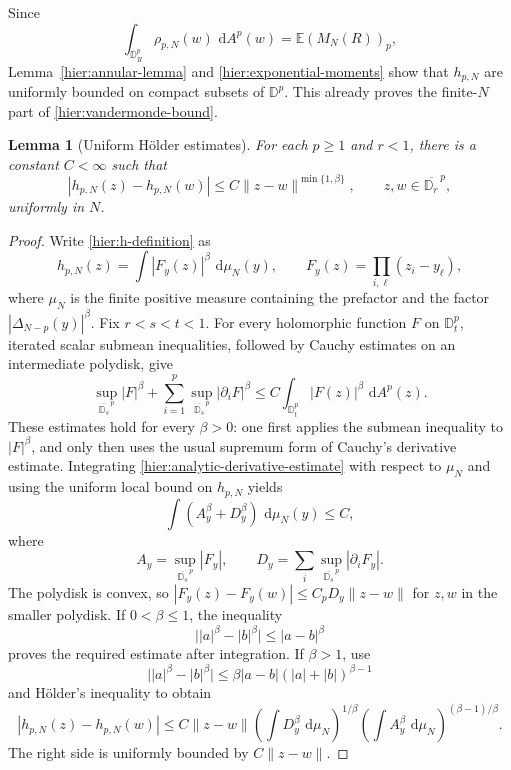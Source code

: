 \documentclass[11pt,a4paper]{article}
\numberwithin{equation}{section}
\newtheorem{lemma}[theorem]{Lemma}
\theoremstyle{definition}
\theoremstyle{remark}
\newcommand{\D}{\mathbb D}
\newcommand{\E}{\mathbb E}
\newcommand{\dd}{\,\mathrm d}
\begin{document}
Since
\[
 \int_{\D_R^p}\rho_{p,N}(w)\,\dd A^p(w)
 =\E(M_N(R))_p,
\]
Lemma~\ref{hier:annular-lemma} and
\eqref{hier:exponential-moments} show that $h_{p,N}$ are uniformly
bounded on compact subsets of $\D^p$.  This already proves the
finite-$N$ part of \eqref{hier:vandermonde-bound}.

\begin{lemma}[Uniform H\"older estimates]
\label{hier:holder-lemma}
For each $p\ge1$ and $r<1$, there is a constant $C<\infty$ such that
\[
 |h_{p,N}(z)-h_{p,N}(w)|
 \le C\|z-w\|^{\min\{1,\beta\}},
 \qquad z,w\in\overline{\D_r}^{\,p},
\]
uniformly in $N$.
\end{lemma}

\begin{proof}
Write \eqref{hier:h-definition} as
\[
 h_{p,N}(z)=\int |F_y(z)|^\beta\,\dd\mu_N(y),
 \qquad F_y(z)=\prod_{i,\ell}(z_i-y_\ell),
\]
where $\mu_N$ is the finite positive measure containing the prefactor
and the factor $|\Delta_{N-p}(y)|^\beta$.
Fix $r<s<t<1$.  For every holomorphic function $F$ on $\D_t^p$,
iterated scalar submean inequalities, followed by Cauchy estimates on
an intermediate polydisk, give
\begin{equation}
 \sup_{\overline{\D_s}^{\,p}}|F|^\beta
 +\sum_{i=1}^p\sup_{\overline{\D_s}^{\,p}}|\partial_iF|^\beta
 \le C\int_{\D_t^p}|F(z)|^\beta\,\dd A^p(z).
 \label{hier:analytic-derivative-estimate}
\end{equation}
These estimates hold for every $\beta>0$: one first applies the
submean inequality to $|F|^\beta$, and only then uses the usual
supremum form of Cauchy's derivative estimate.
Integrating \eqref{hier:analytic-derivative-estimate} with respect to
$\mu_N$ and using the uniform local bound on $h_{p,N}$ yields
\[
 \int(A_y^\beta+D_y^\beta)\,\dd\mu_N(y)\le C,
\]
where
\[
 A_y=\sup_{\overline{\D_s}^{\,p}}|F_y|,
 \qquad
 D_y=\sum_i\sup_{\overline{\D_s}^{\,p}}|\partial_iF_y|.
\]
The polydisk is convex, so
$|F_y(z)-F_y(w)|\le C_pD_y\|z-w\|$ for $z,w$ in the smaller
polydisk.  If $0<\beta\le1$, the inequality
\[
 \big||a|^\beta-|b|^\beta\big|\le|a-b|^\beta
\]
proves the required estimate after integration.  If $\beta>1$, use
\[
 \big||a|^\beta-|b|^\beta\big|
 \le\beta|a-b|(|a|+|b|)^{\beta-1}
\]
and H\"older's inequality to obtain
\[
 |h_{p,N}(z)-h_{p,N}(w)|
 \le C\|z-w\|
 \left(\int D_y^\beta\,\dd\mu_N\right)^{1/\beta}
 \left(\int A_y^\beta\,\dd\mu_N\right)^{(\beta-1)/\beta}.
\]
The right side is uniformly bounded by $C\|z-w\|$.
\end{proof}
\end{document}
